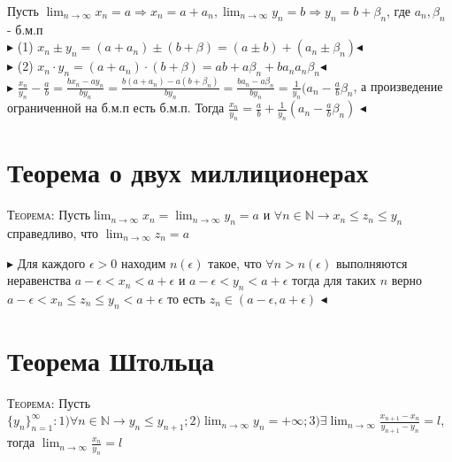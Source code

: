 \documentclass[14pt]{article}
\begin{document}
        Пусть $\lim_{n \rightarrow \infty} x_n = a \Rightarrow x_n = a+ a_n, \lim_{n \rightarrow \infty} y_n = b \Rightarrow y_n = b + \beta_n$, где $a_n, \beta_n$ - б.м.п \\
        $\blacktriangleright$ (1)  $x_n \pm y_n = (a + a_n) \pm (b + \beta) = (a \pm b ) + (a_n \pm \beta_n)$$\blacktriangleleft$\\
        $\blacktriangleright$ (2)  $x_n \cdot y_n = (a + a_n) \cdot (b + \beta) = ab + a\beta_n + ba_n a_n\beta_n$$\blacktriangleleft$\\
        $\blacktriangleright$ $\frac{x_n}{y_n} - \frac{a}{b} = \frac{bx_n - ay_n}{by_n} = \frac{b(a+a_n) - a(b + \beta_n)}{by_n} = \frac{ba_n - a\beta_n}{by_n}=\frac{1}{y_n}(a_n - \frac{a}{b}\beta_n$, а произведение ограниченной на б.м.п есть б.м.п. Тогда $\frac{x_n}{y_n} = \frac{a}{b} + \frac{1}{y_n}(a_n - \frac{a}{b}\beta_n)$ $\blacktriangleleft$\\

    
    \section{Теорема о двух миллиционерах}
        \textsc{Теорема: }Пусть$\lim_{n \rightarrow \infty} x_n = \lim_{n \rightarrow \infty} y_n = a $ и $\forall n \in \mathbb{N} \rightarrow x_n \leqslant z_n \leqslant y_n $ справедливо, что $\lim_{n \rightarrow \infty} z_n = a$

        $\blacktriangleright$ Для каждого $\epsilon > 0$ находим $n(\epsilon)$ такое, что $\forall n > n(\epsilon)$ выполняются неравенства $a - \epsilon < x_n < a + \epsilon $ и $a - \epsilon < y_n < a + \epsilon$ тогда для таких $n$ верно $a - \epsilon < x_n \leqslant z_n \leqslant y_n < a + \epsilon $ то есть $z_n \in (a-\epsilon, a + \epsilon)$ $\blacktriangleleft$\\

        
    \section{Теорема Штольца}
        \textsc{Теорема: } Пусть $\{y_n\}^\infty_{n=1}: 1) \forall n \in \mathbb{N} \rightarrow y_n \leqslant y_{n+1}; 2) \lim_{n \rightarrow \infty} y_n = +\infty; 3) \exists \lim_{n \rightarrow \infty} \frac{x_{n+1} - x_n}{y_{n+1} - y_n} = l$, тогда $\lim_{n \rightarrow \infty} \frac{x_n}{y_n} = l$ \\ 
        
\end{document}
